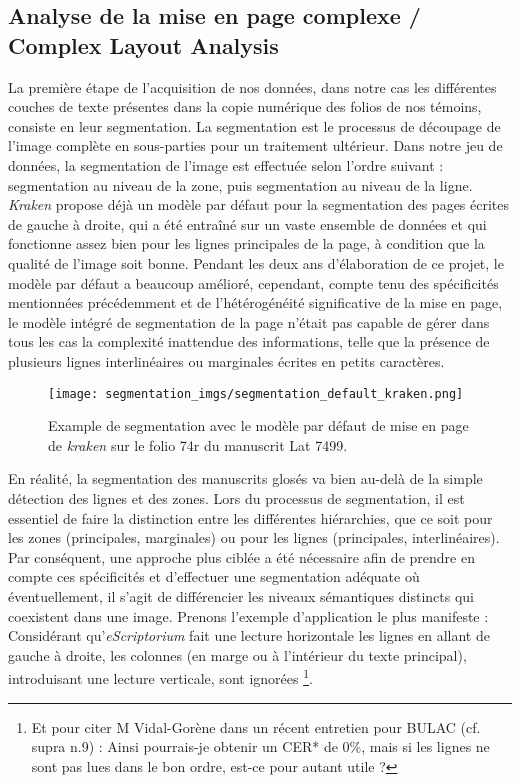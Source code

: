 \documentclass[a4paper, twoside, 12pt]{book}
\begin{document}
\subsection{Analyse de la mise en page complexe / Complex Layout Analysis}

La première étape de l'acquisition de nos données, dans notre cas les différentes couches de texte présentes dans la copie numérique des folios de nos témoins, consiste en leur segmentation. La segmentation est le processus de découpage de l'image complète en sous-parties pour un traitement ultérieur. Dans notre jeu de données, la segmentation de l'image est effectuée selon l'ordre suivant : segmentation au niveau de la zone, puis segmentation au niveau de la ligne. \\ 


\textit{Kraken} propose déjà un modèle par défaut pour la segmentation des pages écrites de gauche à droite, qui a été entraîné sur un vaste ensemble de données et qui fonctionne assez bien pour les lignes principales de la page, à condition que la qualité de l'image soit bonne. Pendant les deux ans d'élaboration de ce projet, le modèle par défaut a beaucoup amélioré, cependant, compte tenu des spécificités mentionnées précédemment et de l'hétérogénéité significative de la mise en page, le modèle intégré de segmentation de la page n'était pas capable de gérer dans tous les cas la complexité inattendue des informations, telle que la présence de plusieurs lignes interlinéaires ou marginales écrites en petits caractères.\\


\begin{figure}[H]
    \centering
    \texttt{[image: segmentation\_imgs/segmentation\_default\_kraken.png]}
    \caption{Example de segmentation avec le modèle par défaut de mise en page de \textit{kraken} sur le folio 74r du manuscrit Lat 7499.}
\end{figure}

En réalité, la segmentation des manuscrits glosés va bien au-delà de la simple détection des lignes et des zones. Lors du processus de segmentation, il est essentiel de faire la distinction entre les différentes hiérarchies, que ce soit pour les zones (principales, marginales) ou pour les lignes (principales, interlinéaires). Par conséquent, une approche plus ciblée a été nécessaire afin de prendre en compte ces spécificités et d'effectuer une segmentation adéquate où éventuellement, il s'agit de différencier les niveaux sémantiques distincts qui coexistent dans une image. Prenons l'exemple d'application le plus manifeste : Considérant qu'\textit{eScriptorium} fait une lecture horizontale les lignes en allant de gauche à droite, les colonnes (en marge ou à l'intérieur du texte principal), introduisant une lecture verticale, sont ignorées \footnote{Et pour citer M  Vidal-Gorène dans un récent entretien pour BULAC (cf. supra n.9) : \og{} Ainsi pourrais-je obtenir un CER* de 0\%, mais si les lignes ne sont pas lues dans le bon ordre, est-ce pour autant utile ?\fg{}}.\\
\end{document}
